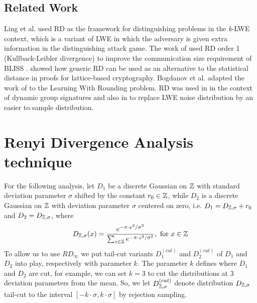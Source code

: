 \subsection{Related Work}
\label{sec:renyiRelatedWorks}
Ling et al. \cite{ling2017hardness} used RD as the framework for distinguishing
problems in the \textit{k}-LWE context, which is a variant of LWE in which the
adversary is given extra information in the distinguishing attack game. The
work of \cite{poppelmann2014enhanced27} used RD order 1 (Kullback-Leibler
divergence) to improve the communication size requirement of BLISS
\cite{ducas2013lattice11}. \cite{bai2015improved5} showed how generic RD can
be used as an alternative to the statistical distance in proofs for
lattice-based cryptography.  Bogdanov et al. \cite{bogdanov2016hardness4}
adapted the work of \cite{bai2015improved5} to the Learning With Rounding
problem. RD was used in \cite{libert2016signature} in the context of dynamic
group signatures and also in \cite{alkim2016post} to replace LWE noise
distribution by an easier to sample distribution.



\section{Renyi Divergence Analysis technique}
\label{sec:secProcRenyi}

For the following analysis, let $D_1$ be a discrete Gaussian on $\mathbb{Z}$ with
standard deviation parameter $\sigma$ shifted by the constant $r_0 \in \mathbb{Z}$, while $D_2$
is a discrete Gaussian on $\mathbb{Z}$ with deviation parameter $\sigma$ centered on zero,
i.e. $D_1 = D_{\mathbb{Z},\sigma} + r_0$ and $D_2 = D_{\mathbb{Z},\sigma}$, where
$$D_{\mathbb{Z},\sigma}(x) = \frac{e^{-\pi \cdot x^2/\sigma^2}}{\sum_{z \in \mathbb{Z}} e^{-\pi \cdot
    z^2/\sigma^2}}, \text{ for } x \in \mathbb{Z}$$
To allow us to use $RD_{\infty}$ we put
tail-cut variants $D_1^{(cut)}$ and $D_2^{(cut)}$ of $D_1$ and $D_2$ into play,
respectively with parameter $k$. The parameter $k$ defines where $D_1$ and $D_2$
are cut, for example, we can set $k=3$ to cut the distributions at 3 deviation
parameters from the mean. So, we let $D_{\mathbb{Z},\sigma}^{(cut)}$ denote
distribution $D_{\mathbb{Z},\sigma}$ tail-cut to the interval
$[-k \cdot \sigma, k \cdot \sigma]$ by rejection sampling.

